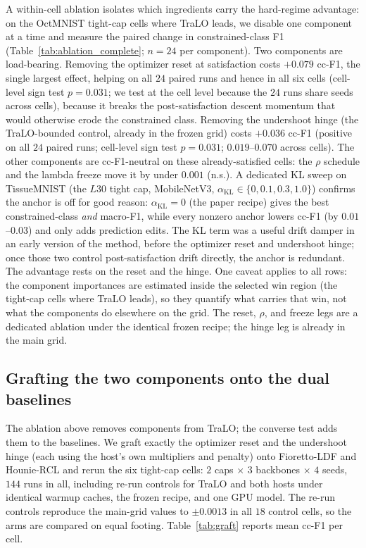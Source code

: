 \documentclass[letterpaper]{article}
\begin{document}
A within-cell ablation isolates which ingredients carry the hard-regime advantage: on the
OctMNIST tight-cap cells where TraLO leads, we disable one component at a time and measure
the paired change in constrained-class F1 (Table~\ref{tab:ablation_complete};
$n{=}24$ per component). Two components are load-bearing.
Removing the optimizer reset at satisfaction costs $+0.079$ cc-F1, the single
largest effect, helping on all $24$ paired runs and hence in all six cells (cell-level
sign test $p\!=\!0.031$; we test at the cell level because the $24$ runs share seeds
across cells), because it breaks
the post-satisfaction descent momentum that would otherwise erode the constrained class.
Removing the undershoot hinge (the TraLO-bounded control, already in the frozen
grid) costs $+0.036$ cc-F1 (positive on all $24$ paired runs; cell-level sign test
$p\!=\!0.031$; $0.019$--$0.070$ across cells). The other
components are cc-F1-neutral on these already-satisfied cells: the $\rho$ schedule and the
lambda freeze move it by under $0.001$ (n.s.). A dedicated KL sweep on TissueMNIST (the
$L30$ tight cap, MobileNetV3, $\alpha_{\mathrm{KL}}\!\in\!\{0,0.1,0.3,1.0\}$) confirms the
anchor is off for good reason: $\alpha_{\mathrm{KL}}{=}0$ (the paper recipe) gives the best
constrained-class \emph{and} macro-F1, while every nonzero anchor lowers cc-F1 (by
$0.01$--$0.03$) and only adds prediction edits. The KL term was a useful drift damper in an
early version of the method, before the optimizer reset and undershoot hinge; once those two
control post-satisfaction drift directly, the anchor is redundant. The advantage rests on
the reset and the hinge. One caveat applies to all rows: the component importances are
estimated inside the selected win region (the tight-cap cells where TraLO leads), so they
quantify what carries that win, not what the components do elsewhere on the grid. The reset, $\rho$, and
freeze legs are a dedicated ablation under the identical frozen recipe; the hinge leg is
already in the main grid.



\subsection{Grafting the two components onto the dual baselines}
\label{app:graft}

The ablation above removes components from TraLO; the converse test adds them to the
baselines. We graft exactly the optimizer reset and the undershoot hinge (each using the
host's own multipliers and penalty) onto Fioretto-LDF and Hounie-RCL and rerun the six
tight-cap cells: $2$ caps $\times$ $3$ backbones $\times$ $4$ seeds, $144$ runs in all,
including re-run controls for TraLO and both hosts under identical warmup caches, the
frozen recipe, and one GPU model. The re-run controls reproduce the main-grid values to
$\pm0.0013$ in all $18$ control cells, so the arms are compared on equal footing.
Table~\ref{tab:graft} reports mean cc-F1 per cell.
\end{document}
